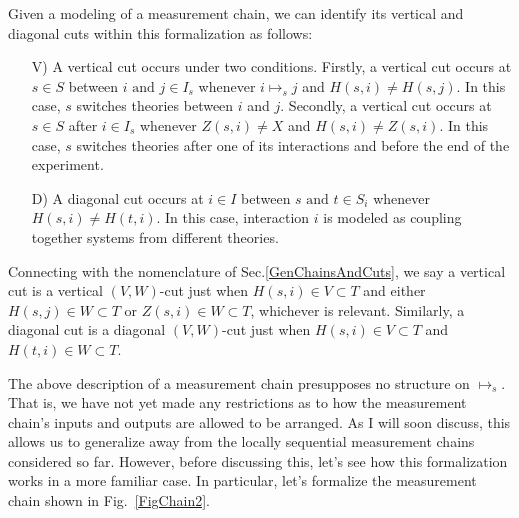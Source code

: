 \documentclass[12pt,prd,superscriptaddress,floatfix,amsmath,amssymb,amsfonts,nofootinbib]{revtex4-2}
\begin{document}
Given a modeling of a measurement chain, we can identify its vertical and diagonal cuts within this formalization as follows:
\begin{itemize}
    \item[V)] A vertical cut occurs under two conditions. Firstly, a vertical cut occurs at $s\in S$ between $i\text{ and }j\in I_s$ whenever $i\mapsto_s j$ and \mbox{$H(s,i)\neq H(s,j)$}. In this case, $s$ switches theories between $i$ and $j$. Secondly, a vertical cut occurs at $s\in S$ after $i\in I_s$ whenever $Z(s,i)\neq X$ and \mbox{$H(s,i)\neq Z(s,i)$}. In this case, $s$ switches theories after one of its interactions and before the end of the experiment.
    \item[D)] A diagonal cut occurs at $i\in I$ between $s\text{ and }t\in S_i$ whenever \mbox{$H(s,i)\neq H(t,i)$}. In this case, interaction $i$ is modeled as coupling together systems from different theories.
\end{itemize}
Connecting with the nomenclature of Sec.\ref{GenChainsAndCuts}, we say a vertical cut is a vertical $(V,W)$-cut just when \mbox{$H(s,i)\in V \subset T$} and either \mbox{$H(s,j)\in W \subset T$} or \mbox{$Z(s,i)\in W \subset T$}, whichever is relevant. Similarly, a diagonal cut is a diagonal $(V,W)$-cut just when \mbox{$H(s,i)\in V \subset T$} and \mbox{$H(t,i)\in W \subset T$}.

The above description of a measurement chain presupposes no structure on $\mapsto_s$. That is, we have not yet made any restrictions as to how the measurement chain's inputs and outputs are allowed to be arranged. As I will soon discuss, this allows us to generalize away from the locally sequential measurement chains considered so far. However, before discussing this, let's see how this formalization  works in a more familiar case. In particular, let's formalize the measurement chain shown in Fig.~\ref{FigChain2}.
\end{document}
